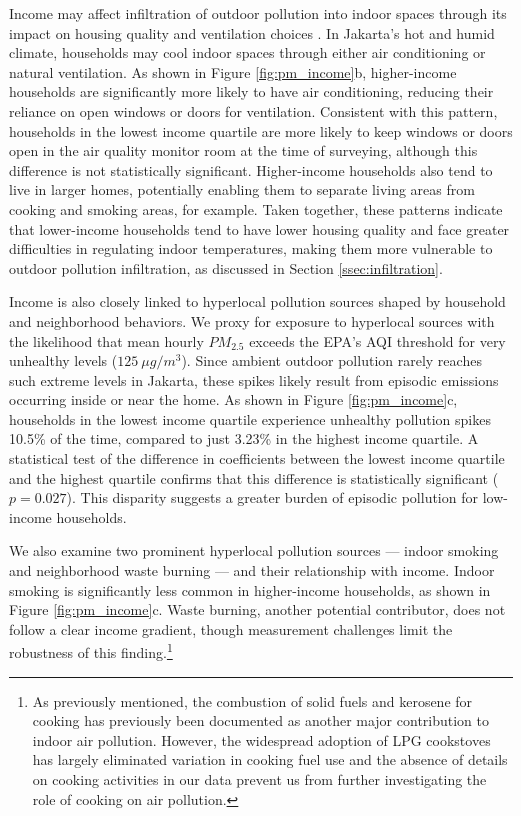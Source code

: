 \documentclass[reqno,12pt,notitlepage]{article}
\begin{document}
Income may affect infiltration of outdoor pollution into indoor spaces through its impact on housing quality and ventilation choices \citep{lunderberg_assessing_2023}. In Jakarta’s hot and humid climate, households may cool indoor spaces through either air conditioning or natural ventilation. As shown in Figure \ref{fig:pm_income}b, higher-income households are significantly more likely to have air conditioning, reducing their reliance on open windows or doors for ventilation. Consistent with this pattern, households in the lowest income quartile are more likely to keep windows or doors open in the air quality monitor room at the time of surveying, although this difference is not statistically significant. Higher-income households also tend to live in larger homes, potentially enabling them to separate living areas from cooking and smoking areas, for example. Taken together, these patterns indicate that lower-income households tend to have lower housing quality and face greater difficulties in regulating indoor temperatures, making them more vulnerable to outdoor pollution infiltration, as discussed in Section \ref{ssec:infiltration}.

Income is also closely linked to hyperlocal pollution sources shaped by household and neighborhood behaviors. We proxy for exposure to hyperlocal sources with the likelihood that mean hourly $PM_{2.5}$ exceeds the EPA's AQI threshold for very unhealthy levels ($125~\mu g / m^3$). Since ambient outdoor pollution rarely reaches such extreme levels in Jakarta, these spikes likely result from episodic emissions occurring inside or near the home. 
%
As shown in Figure \ref{fig:pm_income}c, households in the lowest income quartile experience unhealthy pollution spikes 10.5\% of the time, compared to just 3.23\% in the highest income quartile. A statistical test of the difference in coefficients between the lowest income quartile and the highest quartile confirms that this difference is statistically significant ($p = 0.027$). This disparity suggests a greater burden of episodic pollution for low-income households.

We also examine two prominent hyperlocal pollution sources — indoor smoking and neighborhood waste burning — and their relationship with income. Indoor smoking is significantly less common in higher-income households, as shown in Figure \ref{fig:pm_income}c. Waste burning, another potential contributor, does not follow a clear income gradient, though measurement challenges limit the robustness of this finding.\footnote{As previously mentioned, the combustion of solid fuels and kerosene for cooking has previously been documented as another major contribution to indoor air pollution. However, the widespread adoption of LPG cookstoves has largely eliminated variation in cooking fuel use and the absence of details on cooking activities in our data prevent us from further investigating the role of cooking on air pollution.
}
\end{document}
